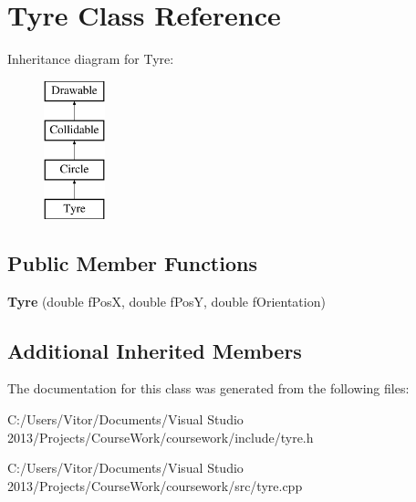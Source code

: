 \hypertarget{class_tyre}{}\section{Tyre Class Reference}
\label{class_tyre}
Inheritance diagram for Tyre\+:\begin{figure}[H]
\begin{center}
\leavevmode
\includegraphics[height=4.000000cm]{class_tyre}
\end{center}
\end{figure}
\subsection*{Public Member Functions}
\begin{DoxyCompactItemize}
\item 
\hypertarget{class_tyre_af984cf335a42ec480d5de68ea28c1714}{}{\bfseries Tyre} (double f\+Pos\+X, double f\+Pos\+Y, double f\+Orientation)\label{class_tyre_af984cf335a42ec480d5de68ea28c1714}

\end{DoxyCompactItemize}
\subsection*{Additional Inherited Members}


The documentation for this class was generated from the following files\+:\begin{DoxyCompactItemize}
\item 
C\+:/\+Users/\+Vitor/\+Documents/\+Visual Studio 2013/\+Projects/\+Course\+Work/coursework/include/tyre.\+h\item 
C\+:/\+Users/\+Vitor/\+Documents/\+Visual Studio 2013/\+Projects/\+Course\+Work/coursework/src/tyre.\+cpp\end{DoxyCompactItemize}
